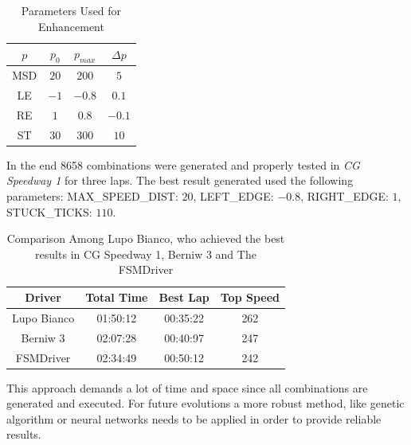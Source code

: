 \begin{table}[h]
\renewcommand{\arraystretch}{1.3}
\caption{Parameters Used for Enhancement}
\label{parameter_table}
\centering
\begin{tabular}{c||c||c||c}
\hline \bfseries $p$ &\bfseries $p_0$ &\bfseries $ p_{max}$ &\bfseries $\Delta p$ \\
\hline
\hline MSD & $20$ & $200$ & $5$ \\ 
\hline LE & $-1$ & $-0.8$ & $0.1$ \\ 
\hline RE & $1$ & $0.8$ & $-0.1$ \\ 
\hline ST & $30$ & $300$ & $10$ \\ 
\hline 
\end{tabular} 
\end{table}

In the end 8658 combinations were generated and properly tested in \textit{CG Speedway 1}
for three laps. The best result generated used the following parameters: MAX\_SPEED\_DIST: $20$, LEFT\_EDGE: $-0.8$, RIGHT\_EDGE: $1$, STUCK\_TICKS: $110$.

\begin{table}[h]
\renewcommand{\arraystretch}{1.3}
\caption{Comparison Among Lupo Bianco, who achieved the best results in CG Speedway 1, Berniw 3 and The FSMDriver}
\label{results_table}
\centering

\begin{tabular}{c||c||c||c}
\hline \bfseries Driver &\bfseries Total Time &\bfseries Best Lap &\bfseries Top Speed \\
\hline
\hline Lupo Bianco & 01:50:12 & 00:35:22 & 262 \\
\hline Berniw 3 & 02:07:28 & 00:40:97 & 247 \\ 
\hline FSMDriver & 02:34:49 & 00:50:12 & 242 \\ 
\hline 
\end{tabular}
\end{table}
This approach demands a lot of time and space since all combinations are generated and executed. For future evolutions a more robust method, like genetic algorithm or neural networks needs to be applied in order to provide reliable results.
